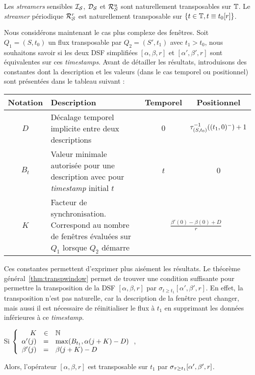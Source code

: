 \begin{prop}\label{prop:transpstr}
    Les \textit{streamers} sensibles $\mathcal{I_S}$, $\mathcal{D_S}$ et $\mathcal{R}_{\mathcal S}^{u}$ sont naturellement transposables sur $\mathbb{T}$.
    Le \textit{streamer} périodique $\mathcal{R}_{\mathcal S}^{r}$ est naturellement transposable sur $\{t\in \mathbb{T}, t\equiv t_0 [r]\}$.
\end{prop}

Nous considérons maintenant le cas plus complexe des fenêtres. Soit $Q_1=(S,t_0)$ un flux transposable par $Q_2=(S',t_1)$ avec $t_1 > t_0$, nous souhaitons savoir si les deux DSF simplifiées $[\alpha,\beta,r]$ et $[\alpha',\beta',r]$ sont équivalentes sur ces \textit{timestamps}. Avant de détailler les résultats, introduisons des constantes dont la description et les valeurs (dans le cas temporel ou positionnel) sont présentées dans le tableau suivant :

\noindent\begin{tabularx}{\linewidth}{|c|X|c|c|} \bottomrule
\rowcolor{hypcolor}     Notation & Description & Temporel & Positionnel\\ \hline
    $D$ & Décalage temporel implicite entre deux descriptions & $0$ & $\tau^{-1}_{(S,t_0)} ((t_1,0)^-)+1$ \\\hline
    $B_t$ & Valeur minimale autorisée pour une description avec pour \textit{timestamp} initial $t$ & $t$ & $0$ \\ \hline
    $K$ & Facteur de synchronisation. Correspond au nombre de fenêtres évaluées sur $Q_1$ lorsque $Q_2$ démarre & \multicolumn{2}{c|}{$\displaystyle\frac{\beta'(0)-\beta(0)+D}{r}$} \\ \toprule
\end{tabularx}

Ces constantes permettent d'exprimer plus aisément les résultats. Le théorème général~\ref{thm:transpwindow} permet de trouver une condition suffisante pour permettre la transposition de la DSF $[\alpha,\beta,r]$ par $\sigma_{t\geq t_1} [\alpha',\beta',r]$. En effet, la transposition n'est pas naturelle, car la description de la fenêtre peut changer, mais aussi il est nécessaire de réinitialiser le flux à $t_1$ en supprimant les données inférieures à ce \textit{timestamp}.
\begin{thm}\label{thm:transpwindow}
    Si $\left\{\begin{array}{rcl} K &\in& \mathbb{N} \\\alpha'(j) &=& \max(B_{t_1}, \alpha(j+K)-D)\\ \beta'(j) &=&  \beta(j+K)-D \end{array}\right.$,

    Alors, l'opérateur $[\alpha,\beta,r]$ est transposable sur $t_1$ par $\sigma_{\tau\geq t_1} [\alpha',\beta',r]$.
\end{thm}

